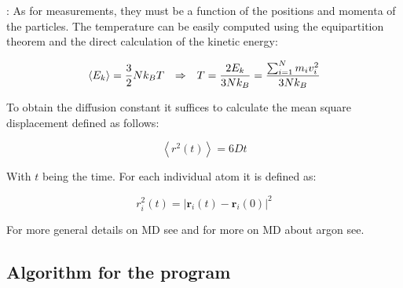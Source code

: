 \documentclass{beamer}
\begin{document}
			\begin{frame}{\secname : \subsecname}
				As for measurements, they must be a function of the positions and momenta of the particles. The temperature can be easily computed using the equipartition theorem and the direct calculation of the kinetic energy:
		
				\begin{equation*}\left\langle E_k\right\rangle=\frac{3}{2}Nk_BT\hspace{0.25 cm}\Rightarrow\hspace{0.25 cm}T=\frac{2E_k}{3Nk_B}=\frac{\sum_{i=1}^N{m_iv_i^2}}{3Nk_B}\end{equation*}
				
				To obtain the diffusion constant it suffices to calculate the mean square displacement defined as follows:
				
				\begin{equation*}\left\langle r^2\left(t\right)\right\rangle=6Dt\end{equation*}
		
				With $t$ being the time. For each individual atom it is defined as:
		
				\begin{equation*}r_i^2\left(t\right)=\left|\mathbf{r}_i\left(t\right)-\mathbf{r}_i\left(0\right)\right|^2\end{equation*}
				
				For more general details on MD see\cite{understanding} and for more on MD about argon see\cite{argon}.
			\end{frame}

		\subsection{Algorithm for the program}
		
\end{document}
